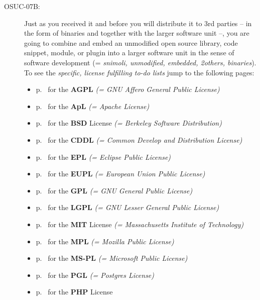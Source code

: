 \begin{description}
\item[OSUC-07B:]\label{OSUC-07B-DEF} Just as you received it and before you will
distribute it to 3rd parties -- in the form of binaries and together with the
larger software unit --, you are going to combine and embed an unmodified open
source library, code snippet, module, or plugin into a larger software unit in
the sense of software development (= \textit{snimoli, unmodified, embedded,
2others, binaries}). To see the \textit{specific, license fulfilling to-do
lists} jump to the following pages:
   \begin{itemize}
    \item p.\ \pageref{OSUC-07B-AGPL} for the \textbf{AGPL}
      \textit{(= GNU Affero General Public License)} 
    \item p.\ \pageref{OSUC-07B-Apache20} for the \textbf{ApL}
      \textit{(= Apache License)}
    \item p.\ \pageref{OSUC-07B-BSD} for the \textbf{BSD} License
      \textit{(= Berkeley Software Distribution)}
    \item p.\ \pageref{OSUC-07B-CDDL} for the \textbf{CDDL}
      \textit{(= Common Develop and Distribution License)}  
    \item p.\ \pageref{OSUC-07B-EPL} for the \textbf{EPL}
      \textit{(= Eclipse Public License)}     
    \item p.\ \pageref{OSUC-07B-EUPL} for the \textbf{EUPL}
      \textit{(= European Union Public License)} 
    \item p.\ \pageref{OSUC-07B-GPL} for the \textbf{GPL}
       \textit{(= GNU General Public License)} 
    \item p.\ \pageref{OSUC-07B-LGPL} for the \textbf{LGPL}
      \textit{(= GNU Lesser General Public License)}           
    \item p.\ \pageref{OSUC-07B-MIT} for the \textbf{MIT} License
       \textit{(= Massachusetts Institute of Technology)} 
    \item p.\ \pageref{OSUC-07B-MPL} for the \textbf{MPL}
      \textit{(= Mozilla Public License)}     
    \item p.\ \pageref{OSUC-07B-MS-PL} for the \textbf{MS-PL}
      \textit{(= Microsoft Public License)} 
    \item p.\ \pageref{OSUC-07B-PGL} for the \textbf{PGL}
      \textit{(= Postgres License)} 
    \item p.\ \pageref{OSUC-07B-PHP} for the \textbf{PHP} License 
  \end{itemize}


\end{description}

